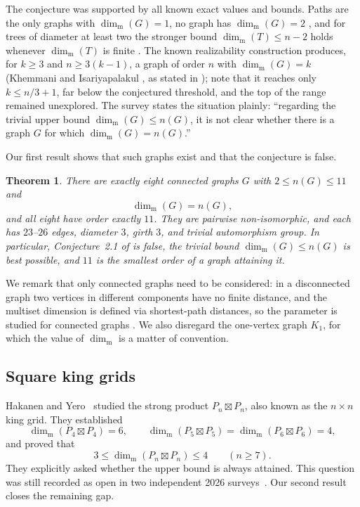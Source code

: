 \documentclass[11pt]{amsart}
\newtheorem{theorem}{Theorem}[section]
\theoremstyle{remark}
\newcommand{\mdim}{\operatorname{dim}_{\mathrm m}}
\begin{document}
The conjecture was supported by all known exact values and bounds.  Paths are the only graphs with $\mdim(G)=1$, no graph has $\mdim(G)=2$ \cite{SimanjuntakEtAl}, and for trees of diameter at least two the stronger bound $\mdim(T)\le n-2$ holds whenever $\mdim(T)$ is finite \cite{HafidhEtAl2019}.  The known realizability construction produces, for $k\ge 3$ and $n\ge 3(k-1)$, a graph of order $n$ with $\mdim(G)=k$ (Khemmani and Isariyapalakul \cite[Theorem~5]{KhemmaniIsariyapalakul2018}, as stated in \cite{FarhanEtAl2026}); note that it reaches only $k\le n/3+1$, far below the conjectured threshold, and the top of the range remained unexplored.  The survey \cite{FarhanEtAl2026} states the situation plainly: ``regarding the trivial upper bound $\mdim(G)\le n(G)$, it is not clear whether there is a graph $G$ for which $\mdim(G)=n(G)$.''

Our first result shows that such graphs exist and that the conjecture is false.

\begin{theorem}\label{thm:order}
There are exactly eight connected graphs $G$ with $2\le n(G)\le 11$ and
\[
\mdim(G)=n(G),
\]
and all eight have order exactly $11$.  They are pairwise non-isomorphic, and each has $23$--$26$ edges, diameter $3$, girth $3$, and trivial automorphism group.  In particular, Conjecture~2.1 of \cite{SimanjuntakEtAl} is false, the trivial bound $\mdim(G)\le n(G)$ is best possible, and $11$ is the smallest order of a graph attaining it.
\end{theorem}

We remark that only connected graphs need to be considered: in a disconnected graph two vertices in different components have no finite distance, and the multiset dimension is defined via shortest-path distances, so the parameter is studied for connected graphs \cite{SimanjuntakEtAl,FarhanEtAl2026}.  We also disregard the one-vertex graph $K_1$, for which the value of $\mdim$ is a matter of convention.

\subsection{Square king grids}

Hakanen and Yero~\cite{HakanenYero2024} studied the strong product $P_n\boxtimes P_n$, also known as the $n\times n$ king grid.  They established
\[
 \mdim(P_4\boxtimes P_4)=6,
 \qquad
 \mdim(P_5\boxtimes P_5)=\mdim(P_6\boxtimes P_6)=4,
\]
and proved that
\[
 3\le \mdim(P_n\boxtimes P_n)\le 4 \qquad (n\ge 7).
\]
They explicitly asked whether the upper bound is always attained.  This question was still recorded as open in two independent 2026 surveys~\cite{AlbejaniEtAl2026,FarhanEtAl2026}.  Our second result closes the remaining gap.
\end{document}
